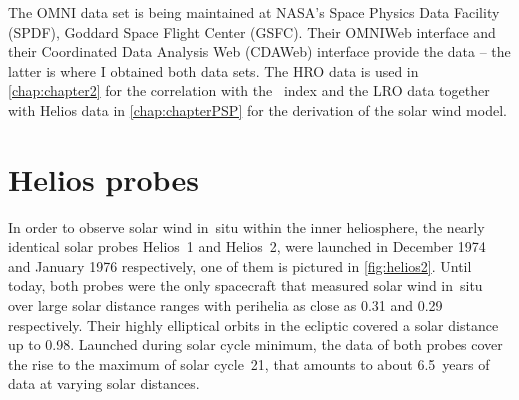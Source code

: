The OMNI data set is being maintained at NASA's Space Physics Data Facility (SPDF), Goddard Space Flight Center (GSFC). Their OMNIWeb interface  and their Coordinated Data Analysis Web (CDAWeb) interface  provide the data -- the latter is where I obtained both data sets. The HRO data is used in \autoref{chap:chapter2} for the correlation with the \Kp~index and the LRO data together with Helios data in \autoref{chap:chapterPSP} for the derivation of the solar wind model.

\pagebreak

\section{Helios probes}
\label{sec:helios_probes}
In order to observe solar wind in~situ within the inner heliosphere, the nearly identical solar probes Helios~1 and Helios~2, were launched in December 1974 and January 1976 respectively, one of them is pictured in \autoref{fig:helios2}. Until today, both probes were the only spacecraft that measured solar wind in~situ over large solar distance ranges with perihelia as close as \SI{0.31}{\au} and \SI{0.29}{\au} respectively. Their highly elliptical orbits in the ecliptic covered a solar distance up to \SI{0.98}{\au}. Launched during solar cycle minimum, the data of both probes cover the rise to the maximum of solar cycle~21, that amounts to about 6.5~years of data at varying solar distances.
